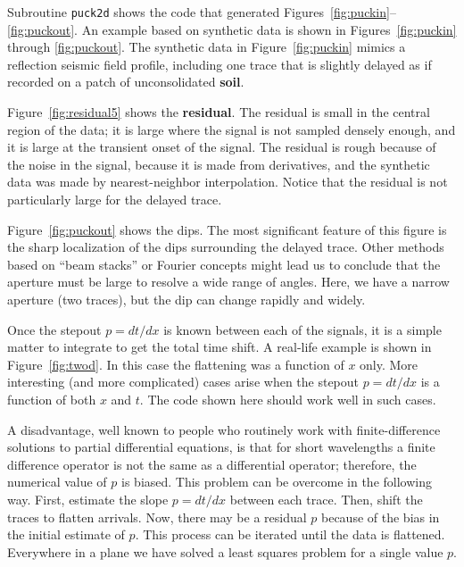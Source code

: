 
Subroutine {\tt puck2d} shows the code that generated
Figures~\ref{fig:puckin}--\ref{fig:puckout}.
An example based on synthetic data is shown
in Figures~\ref{fig:puckin} through \ref{fig:puckout}.
The synthetic data in Figure~\ref{fig:puckin} mimics
a reflection seismic field profile,
including one trace that is slightly delayed
as if recorded on a patch of unconsolidated {\bf soil}. 

\par
Figure~\ref{fig:residual5} shows the {\bf residual}.
The residual is small in the central region of the data;
it is large where the signal is not sampled densely enough,
and it is large at the transient onset of the signal.
The residual is rough because of the noise in the signal,
because it is made from derivatives,
and the synthetic data was made by nearest-neighbor interpolation.
Notice that the residual is not particularly large for the delayed trace. 
\par
Figure~\ref{fig:puckout} shows the dips.
The most significant feature of this figure
is the sharp localization of the dips surrounding the delayed trace.
Other methods based on ``beam stacks'' or Fourier concepts
might lead us to conclude that the aperture must be large
to resolve a wide range of angles.
Here, we have a narrow aperture (two traces),
but the dip can change rapidly and widely.
\par


\par
Once the stepout $p = d t /d x$ is known between each of the signals, it is a simple matter to integrate to get the total time shift.  A real-life example is shown in Figure~\ref{fig:twod}.
%
%
In this case the flattening was a function of $x$ only.  More interesting (and more complicated) cases arise when the stepout $p = d t /d x$ is a function of both $x$ and $t$.  The code shown here should work well in such cases.
\par
A disadvantage, well known to people who routinely work with finite-difference solutions to partial differential equations, is that for short wavelengths a finite difference operator is not the same as a differential operator; therefore, the numerical value of $p$ is biased.  This problem can be overcome in the following way.  First, estimate the slope $p= d t /d x$ between each trace. Then, shift the traces to flatten arrivals.  Now, there may be a residual $p$ because of the bias in the initial estimate of $p$.  This process can be iterated until the data is flattened.  Everywhere in a plane we have solved a least squares problem for a single value $p$.  
	
